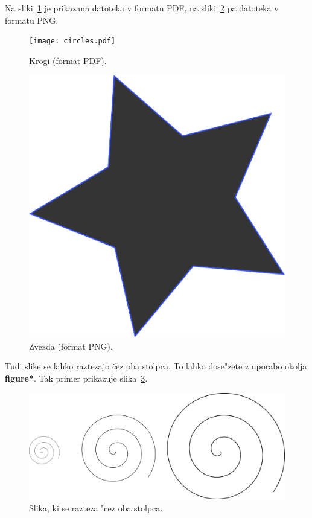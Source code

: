 \documentclass[sigconf,nonacm]{acmart}
\begin{document}
Na sliki~\ref{fig:circles} je prikazana datoteka v formatu PDF, na
sliki~\ref{fig:star} pa datoteka v formatu PNG\@.

\begin{figure}
    \centering
    \texttt{[image: circles.pdf]}
    \caption{Krogi (format PDF).}
    \label{fig:circles}
\end{figure}

\begin{figure}
    \centering
    \includegraphics[scale=0.5]{star.png}
    \caption{Zvezda (format PNG).}
    \label{fig:star}
\end{figure}

Tudi slike se lahko raztezajo čez oba stolpca.  To lahko dose"zete z uporabo
okolja \textbf{figure*}.  Tak primer prikazuje slika~\ref{fig:spin}.

\begin{figure}
    \centering
    \includegraphics[scale=0.8]{spin.png}
    \caption{Slika, ki se razteza "cez oba stolpca.}
    \label{fig:spin}
\end{figure}
\end{document}
